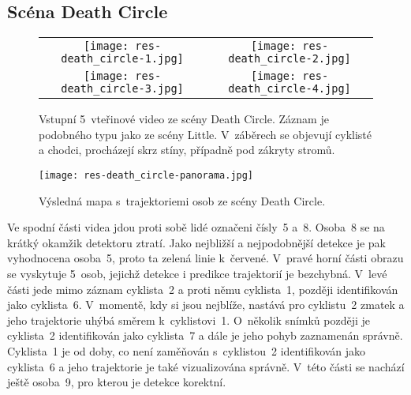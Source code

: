 
\subsection*{Scéna Death Circle}

\begin{figure}[H]
    \begin{tabular}{cc}
        \texttt{[image: res-death\_circle-1.jpg]} &
        \texttt{[image: res-death\_circle-2.jpg]} \\
        \texttt{[image: res-death\_circle-3.jpg]} &
        \texttt{[image: res-death\_circle-4.jpg]} \\
    \end{tabular}
    \caption[Otestování algoritmu na scéně Death Circle]{Vstupní 5~vteřinové video ze scény Death Circle. Záznam je podobného typu jako ze scény Little. V~záběrech se objevují cyklisté a chodci, procházejí skrz stíny, případně pod zákryty stromů.}
\end{figure}

\begin{figure}[H]
    \centering
    \texttt{[image: res-death\_circle-panorama.jpg]}
    \caption[Výsledná mapa s~trajektoriemi osob ze scény Death Circle]{Výsledná mapa s~trajektoriemi osob ze scény Death Circle.}
\end{figure}

Ve spodní části videa jdou proti sobě lidé označeni čísly~5 a~8. Osoba~8 se na krátký okamžik detektoru ztratí. Jako nejbližší a nejpodobnější detekce je pak vyhodnocena osoba~5, proto ta zelená linie k~červené. V~pravé horní části obrazu se vyskytuje 5~osob, jejichž detekce i predikce trajektorií je bezchybná. V~levé části jede mimo záznam cyklista~2 a proti němu cyklista~1, později identifikován jako cyklista~6. V~momentě, kdy si jsou nejblíže, nastává pro cyklistu~2 zmatek a jeho trajektorie uhýbá směrem k~cyklistovi~1. O~několik snímků později je cyklista~2 identifikován jako cyklista~7 a dále je jeho pohyb zaznamenán správně. Cyklista~1 je od doby, co není zaměňován s~cyklistou~2 identifikován jako cyklista~6 a jeho trajektorie je také vizualizována správně. V~této části se nachází ještě osoba~9, pro kterou je detekce korektní.


